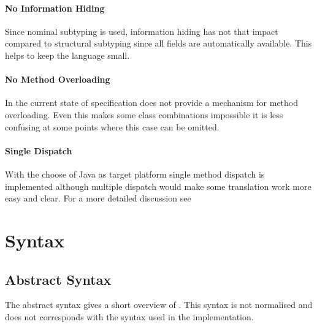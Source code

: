 \paragraph{No Information Hiding}
Since nominal subtyping is used, information hiding has not that impact
compared to structural subtyping since all fields are automatically
available. This helps to keep the language small.

\paragraph{No Method Overloading}
In the current state of specification \ooplss does not provide a mechanism
for method overloading. Even this makes some class combinations impossible
it is less confusing at some points where this case can be omitted.

\paragraph{Single Dispatch}
With the choose of Java as target platform single method dispatch is
implemented although multiple dispatch would make some translation work 
more easy and clear. For a more detailed discussion see 

\section{Syntax}
\subsection{Abstract Syntax}
The abstract syntax gives a short overview of \ooplss. This syntax is
not normalised and does not corresponds with the syntax used in the
implementation.

